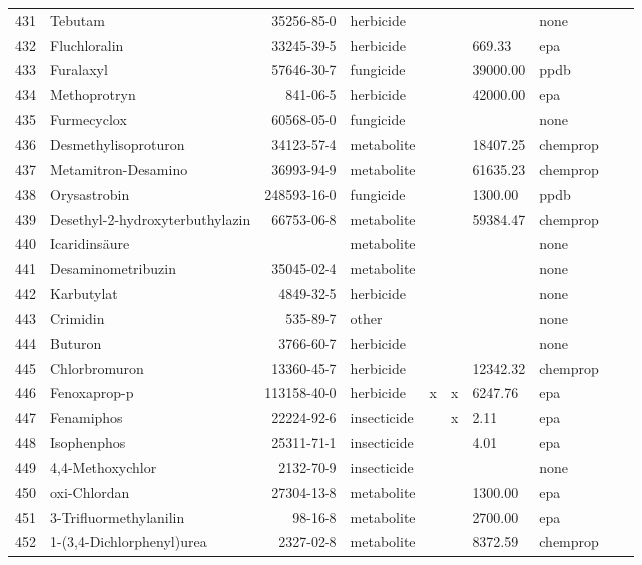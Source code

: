 \begin{longtable}{lp{3cm}rlp{0.5cm}p{0.5cm}p{1.5cm}p{1cm}p{1cm}p{1cm}}
  431 & Tebutam & 35256-85-0 & herbicide &  &  &  & none &  &  \\ 
  432 & Fluchloralin & 33245-39-5 & herbicide &  &  & 669.33 & epa &  &  \\ 
  433 & Furalaxyl & 57646-30-7 & fungicide &  &  & 39000.00 & ppdb &  &  \\ 
  434 & Methoprotryn & 841-06-5 & herbicide &  &  & 42000.00 & epa &  &  \\ 
  435 & Furmecyclox & 60568-05-0 & fungicide &  &  &  & none &  &  \\ 
  436 & Desmethylisoproturon & 34123-57-4 & metabolite &  &  & 18407.25 & chemprop &  &  \\ 
  437 & Metamitron-Desamino & 36993-94-9 & metabolite &  &  & 61635.23 & chemprop &  &  \\ 
  438 & Orysastrobin & 248593-16-0 & fungicide &  &  & 1300.00 & ppdb &  &  \\ 
  439 & Desethyl-2-hydroxyterbuthylazin & 66753-06-8 & metabolite &  &  & 59384.47 & chemprop &  &  \\ 
  440 & Icaridinsäure &  & metabolite &  &  &  & none &  &  \\ 
  441 & Desaminometribuzin & 35045-02-4 & metabolite &  &  &  & none &  &  \\ 
  442 & Karbutylat & 4849-32-5 & herbicide &  &  &  & none &  &  \\ 
  443 & Crimidin & 535-89-7 & other &  &  &  & none &  &  \\ 
  444 & Buturon & 3766-60-7 & herbicide &  &  &  & none &  &  \\ 
  445 & Chlorbromuron & 13360-45-7 & herbicide &  &  & 12342.32 & chemprop &  &  \\ 
  446 & Fenoxaprop-p & 113158-40-0 & herbicide & x & x & 6247.76 & epa &  &  \\ 
  447 & Fenamiphos & 22224-92-6 & insecticide &  & x & 2.11 & epa &  &  \\ 
  448 & Isophenphos & 25311-71-1 & insecticide &  &  & 4.01 & epa &  &  \\ 
  449 & 4,4-Methoxychlor & 2132-70-9 & insecticide &  &  &  & none &  &  \\ 
  450 & oxi-Chlordan & 27304-13-8 & metabolite &  &  & 1300.00 & epa &  &  \\ 
  451 & 3-Trifluormethylanilin & 98-16-8 & metabolite &  &  & 2700.00 & epa &  &  \\ 
  452 & 1-(3,4-Dichlorphenyl)urea & 2327-02-8 & metabolite &  &  & 8372.59 & chemprop &  &  \\ 

\end{longtable}
